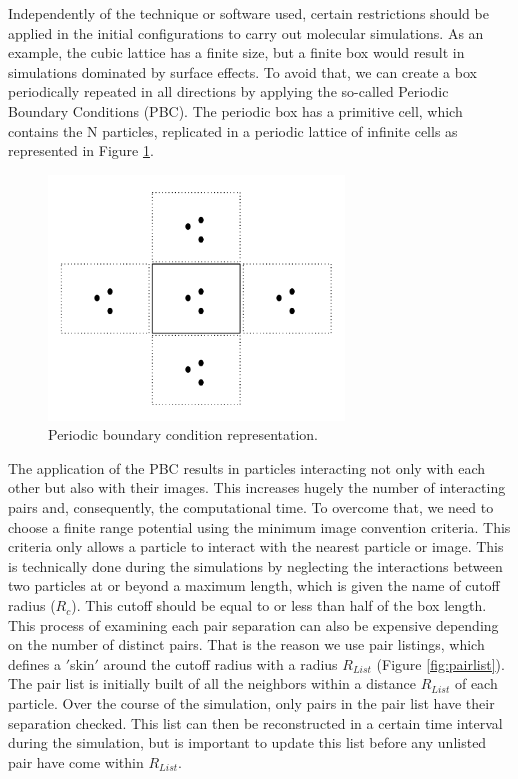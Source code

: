 Independently of the technique or software used, certain restrictions should be applied in the initial configurations to carry out molecular simulations. As an example, the cubic lattice has a finite size, but a finite box would result in simulations dominated by surface effects. To avoid that, we can create a box periodically repeated in all directions by applying the so-called Periodic Boundary Conditions (PBC). The periodic box has a primitive cell, which contains the N particles, replicated in a periodic lattice of infinite cells as represented in Figure \ref{fig:pbc}. 

\begin{figure}
	\centering
	\includegraphics[width=0.7\textwidth]{Figures/pbc}
	\caption{Periodic boundary condition representation.}
	\label{fig:pbc}
\end{figure}

The application of the PBC results in particles interacting not only with each other but also with their images. This increases hugely the number of interacting pairs and, consequently, the computational time. To overcome that, we need to choose a finite range potential using the minimum image convention criteria. This criteria only allows a particle to interact with the nearest particle or image.  This is technically done during the simulations by neglecting the interactions between two particles at or beyond a maximum length, which is given the name of cutoff radius ($R_{c}$). This cutoff should be equal to or less than half of the box length. This process of examining each pair separation can also be expensive depending on the number of distinct pairs. That is the reason we use pair listings, which defines a $'$skin$'$ around the cutoff radius with a radius $R_{List}$ (Figure \ref{fig:pairlist}). The pair list is initially built of all the neighbors within a distance $R_{List}$ of each particle. Over the course of the simulation, only pairs in the pair list have their separation checked. This list can then be reconstructed in a certain time interval during the simulation, but is important to update this list before any unlisted pair have come within $R_{List}$.    

